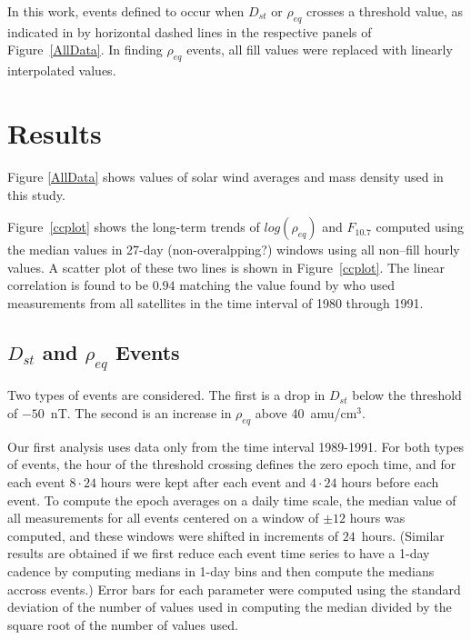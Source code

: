 \documentclass[10pt,twocolumn]{article}
\begin{document}

In this work, events defined to occur when $D_{st}$ or $\rho_{eq}$ crosses a threshold value, as indicated in by horizontal dashed lines in the respective panels of Figure~\ref{AllData}.  In finding $\rho_{eq}$ events, all fill values were replaced with linearly interpolated values. 


\section{Results}
Figure \ref{AllData} shows values of solar wind averages and mass density used in this study.  

Figure~\ref{ccplot} shows the long-term trends of $log(\rho_{eq})$ and $F_{10.7}$ computed using the median values in 27-day (non-overalpping?) windows using all non--fill hourly values.  A scatter plot of these two lines is shown in Figure~\ref{ccplot}.  The linear correlation is found to be $0.94$ matching the value found by \cite{Takahashi2010} who used measurements from all satellites in the time interval of 1980 through 1991.

\subsection{$D_{st}$ and $\rho_{eq}$ Events}

Two types of events are considered. The first is a drop in $D_{st}$ below the threshold of $-50$~nT.  The second is an increase in $\rho_{eq}$ above 40~amu/cm$^3$.

Our first analysis uses data only from the time interval 1989-1991. For both types of events, the hour of the threshold crossing defines the zero epoch time, and for each event $8\cdot24$ hours were kept after each event and $4\cdot24$ hours before each event.  To compute the epoch averages on a daily time scale, the median value of all measurements for all events centered on a window of $\pm 12$ hours was computed, and these windows were shifted in increments of $24$~hours. (Similar results are obtained if we first reduce each event time series to have a 1-day cadence by computing medians in 1-day bins and then compute the medians accross events.)  Error bars for each parameter were computed using the standard deviation of the number of values used in computing the median divided by the square root of the number of values used.
\end{document}
